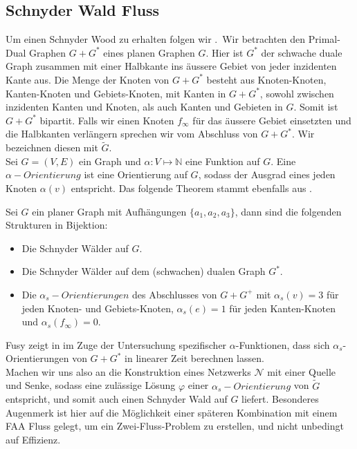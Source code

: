 \subsection{Schnyder Wald Fluss}

Um einen Schnyder Wood zu erhalten folgen wir \cite{felsner04lattice}.\
Wir betrachten den Primal-Dual Graphen $G+G^*$ eines planen Graphen $G$. Hier ist $G^*$ der schwache duale Graph zusammen mit einer Halbkante ins äussere Gebiet von jeder inzidenten Kante aus. Die Menge der Knoten von $G+G^*$ besteht aus Knoten-Knoten, Kanten-Knoten und Gebiets-Knoten, mit Kanten in $G+G^*$, sowohl zwischen inzidenten Kanten und Knoten, als auch Kanten und Gebieten in $G$. Somit ist $G+G^*$ bipartit. Falls wir einen Knoten $f_\infty$ für das äussere Gebiet einsetzten und die Halbkanten verlängern sprechen wir vom Abschluss von $G+G^*$. Wir bezeichnen diesen mit $\tilde{G}$.\\
Sei $G=(V,E)$ ein Graph und $\alpha:V\mapsto\mathbb{N}$ eine Funktion auf $G$. Eine $\alpha-Orientierung$ ist eine Orientierung auf $G$, sodass der Ausgrad eines jeden Knoten $\alpha(v)$ entspricht. Das folgende Theorem stammt ebenfalls aus \cite{felsner04lattice}.

\begin{theorem}
Sei $G$ ein planer Graph mit Aufhängungen $\{a_1,a_2,a_3\}$, dann sind die folgenden Strukturen in Bijektion:
\begin{itemize}
\item Die Schnyder Wälder auf $G$.
\item Die Schnyder Wälder auf dem (schwachen) dualen Graph $G^*$.
\item Die $\alpha_{s}-Orientierungen$ des Abschlusses von $G+G^+$ mit $\alpha_s(v) = 3$ für jeden Knoten- und Gebiets-Knoten,  $\alpha_s(e) = 1$ für jeden Kanten-Knoten und  $\alpha_s(f_\infty) = 0$.
\end{itemize}
\end{theorem}

Fusy zeigt in \cite{fusy07} im Zuge der Untersuchung spezifischer $\alpha$-Funktionen, dass sich $\alpha_s$-Orientierungen von $G+G^*$ in linearer Zeit berechnen lassen.\\

Machen wir uns also an die Konstruktion eines Netzwerks $\mathcal{N}$ mit einer Quelle und Senke, sodass eine zulässige Lösung $\varphi$ einer $\alpha_s-Orientierung$ von $\tilde{G}$ entspricht, und somit auch einen Schnyder Wald auf $G$ liefert. Besonderes Augenmerk ist hier auf die Möglichkeit einer späteren Kombination mit einem FAA Fluss gelegt, um ein Zwei-Fluss-Problem zu erstellen, und nicht unbedingt auf Effizienz.\


